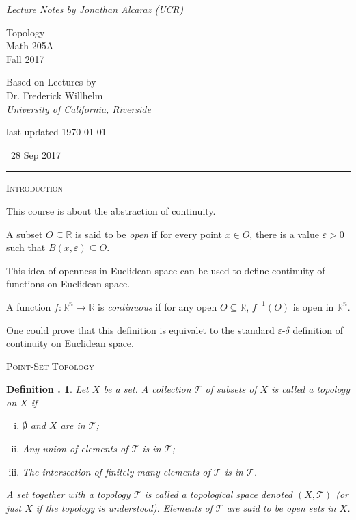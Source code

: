 \documentclass[twoside]{report}
\newcommand{\R}{\mathbb{R}}
\newcommand{\cleanbr}{\vspace{1em}\noindent}
\newcounter{Lecture}
\newcommand{\newLec}[1]{
  \stepcounter{Lecture}
  \noindent{\Large\bf Lecture \arabic{Lecture}} \, #1 \hfill  \rule[1ex]{2.5in}{.1pt} \vspace{1em}
}
\theoremstyle{myts}
\newcounter{c}[Lecture]
\newtheorem{dfn}[c]{Definition \arabic{Lecture}.}
\newcounter{ex}[Lecture]
\begin{document}
\begin{titlepage}
  \centering
  {\it Lecture Notes by Jonathan Alcaraz (UCR)} \\
  
  \vfill
  
  {\Huge Topology} \\
  \vspace{1em}
  {Math 205A} \\
  {Fall 2017} \\

  \vfill
  
  {Based on Lectures by} \\
  \vspace{1em}
  {\Large Dr. Frederick Willhelm} \\
  {\it University of California, Riverside}
  
  \vfill

  {\tiny last updated \today}
\end{titlepage}
\setcounter{page}{1}


\newLec{28 Sep 2017}

\cleanbr
{\large\scshape Introduction}

\cleanbr
This course is about the abstraction of continuity.

\cleanbr
A subset \(O\subseteq\R\) is said to be \emph{open} if for every point \(x\in O\), there is a value \(\varepsilon > 0\) such that \( B(x,\varepsilon) \subseteq O \).

\cleanbr
This idea of openness in Euclidean space can be used to define continuity of functions on Euclidean space.

\cleanbr
A function \(f:\R^n \to \R\) is \emph{continuous} if for any open \(O\subseteq\R\), \(f^{-1}(O)\) is open in $\R^n$.

\cleanbr
One could prove that this definition is equivalet to the standard $\varepsilon$-$\delta$ definition of continuity on Euclidean space.

\cleanbr
{\large\scshape Point-Set Topology}

\begin{dfn}
  Let $X$ be a set. A collection $\mathcal{T}$ of subsets of $X$ is called a \emph{topology} on $X$ if
  \begin{enumerate}[(i)]
    \item $\emptyset$ and $X$ are in $\mathcal{T}$;
    \item Any union of elements of $\mathcal{T}$ is in $\mathcal{T}$;
    \item The intersection of finitely many elements of $\mathcal{T}$ is in $\mathcal{T}$.
  \end{enumerate}
  A set together with a topology $\mathcal{T}$ is called a \emph{topological space} denoted \( (X,\mathcal{T}) \) (or just $X$ if the topology is understood). Elements of $\mathcal{T}$ are said to be \emph{open sets in $X$}.
\end{dfn}
\end{document}
